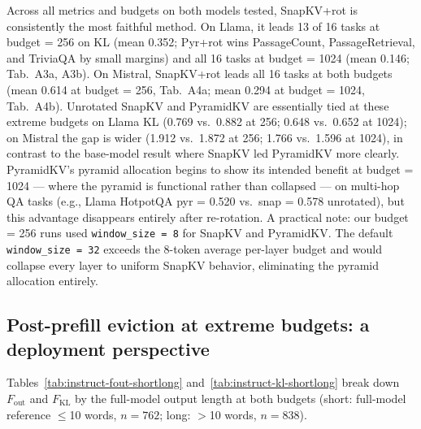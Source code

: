 \documentclass[10pt,letterpaper]{article}
\begin{document}
Across all metrics and budgets on both models tested, SnapKV+rot is
consistently the most faithful method. On Llama, it leads 13 of 16 tasks at
budget = 256 on KL (mean 0.352; Pyr+rot wins PassageCount, PassageRetrieval,
and TriviaQA by small margins) and all 16 tasks at budget = 1024
(mean 0.146; Tab.~A3a, A3b). On Mistral, SnapKV+rot leads all 16 tasks at
both budgets (mean 0.614 at budget = 256, Tab.~A4a; mean 0.294 at budget = 1024,
Tab.~A4b). Unrotated SnapKV and PyramidKV are essentially tied at
these extreme budgets on Llama KL (0.769 vs.\ 0.882 at 256; 0.648 vs.\ 0.652
at 1024); on Mistral the gap is wider (1.912 vs.\ 1.872 at 256; 1.766 vs.\ 1.596
at 1024), in contrast to the base-model result where SnapKV led PyramidKV
more clearly. PyramidKV's pyramid allocation begins to show its intended
benefit at budget = 1024 --- where the pyramid is functional rather than
collapsed --- on multi-hop QA tasks (e.g., Llama HotpotQA pyr = 0.520 vs.\
snap = 0.578 unrotated), but this advantage disappears entirely after
re-rotation. A practical note: our budget = 256 runs used
\texttt{window\_size = 8} for SnapKV and PyramidKV. The default
\texttt{window\_size = 32} exceeds the 8-token average per-layer budget
and would collapse every layer to uniform SnapKV behavior, eliminating
the pyramid allocation entirely.

\subsection*{Post-prefill eviction at extreme budgets: a deployment perspective}

Tables~\ref{tab:instruct-fout-shortlong} and~\ref{tab:instruct-kl-shortlong}
break down \(F_{\text{out}}\) and \(F_{\text{KL}}\) by the full-model output
length at both budgets (short: full-model reference \(\leq\)10 words,
$n=762$; long: \(>\)10 words, $n=838$).
\end{document}
